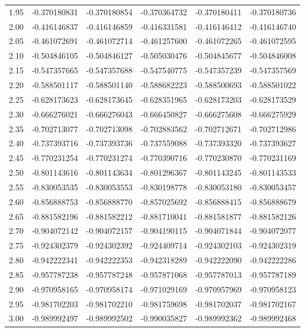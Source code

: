 \documentclass[11pt,a4paper]{article}
\begin{document}
\begin{longtable}{rrrrrr}
1.95 & -0.370180831 & -0.370180854 & -0.370364732 & -0.370180411 & -0.370180736 \\
2.00 & -0.416146837 & -0.416146859 & -0.416331581 & -0.416146412 & -0.416146740 \\
2.05 & -0.461072691 & -0.461072714 & -0.461257600 & -0.461072265 & -0.461072595 \\
2.10 & -0.504846105 & -0.504846127 & -0.505030476 & -0.504845677 & -0.504846008 \\
2.15 & -0.547357665 & -0.547357688 & -0.547540775 & -0.547357239 & -0.547357569 \\
2.20 & -0.588501117 & -0.588501140 & -0.588682223 & -0.588500693 & -0.588501022 \\
2.25 & -0.628173623 & -0.628173645 & -0.628351965 & -0.628173203 & -0.628173529 \\
2.30 & -0.666276021 & -0.666276043 & -0.666450827 & -0.666275608 & -0.666275929 \\
2.35 & -0.702713077 & -0.702713098 & -0.702883562 & -0.702712671 & -0.702712986 \\
2.40 & -0.737393716 & -0.737393736 & -0.737559088 & -0.737393320 & -0.737393627 \\
2.45 & -0.770231254 & -0.770231274 & -0.770390716 & -0.770230870 & -0.770231169 \\
2.50 & -0.801143616 & -0.801143634 & -0.801296367 & -0.801143245 & -0.801143533 \\
2.55 & -0.830053535 & -0.830053553 & -0.830198778 & -0.830053180 & -0.830053457 \\
2.60 & -0.856888753 & -0.856888770 & -0.857025692 & -0.856888415 & -0.856888679 \\
2.65 & -0.881582196 & -0.881582212 & -0.881710041 & -0.881581877 & -0.881582126 \\
2.70 & -0.904072142 & -0.904072157 & -0.904190115 & -0.904071844 & -0.904072077 \\
2.75 & -0.924302379 & -0.924302392 & -0.924409714 & -0.924302103 & -0.924302319 \\
2.80 & -0.942222341 & -0.942222353 & -0.942318289 & -0.942222090 & -0.942222286 \\
2.85 & -0.957787238 & -0.957787248 & -0.957871068 & -0.957787013 & -0.957787189 \\
2.90 & -0.970958165 & -0.970958174 & -0.971029169 & -0.970957969 & -0.970958123 \\
2.95 & -0.981702203 & -0.981702210 & -0.981759698 & -0.981702037 & -0.981702167 \\
3.00 & -0.989992497 & -0.989992502 & -0.990035827 & -0.989992362 & -0.989992468 \\

\end{longtable}
\end{document}
